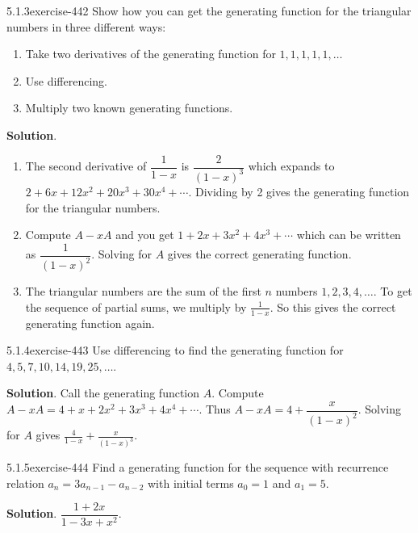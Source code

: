 \documentclass[twoside,11pt,]{book}
\numberwithin{equation}{chapter}
\renewcommand{\d}{\displaystyle}
\begin{document}
\begin{divisionsolution}{5.1.3}{}{exercise-442}%
\hypertarget{p-5092}{}%
Show how you can get the generating function for the triangular numbers in three different ways:\leavevmode%
\begin{enumerate}[label=(\alph*)]
\item\hypertarget{li-2454}{}\hypertarget{p-5093}{}%
Take two derivatives of the generating function for \(1,1,1,1,1, \ldots\)%
\item\hypertarget{li-2455}{}\hypertarget{p-5094}{}%
Use differencing.%
\item\hypertarget{li-2456}{}\hypertarget{p-5095}{}%
Multiply two known generating functions.%
\end{enumerate}
%
\par\smallskip%
\noindent\textbf{Solution}.\quad%
\hypertarget{p-5096}{}%
\leavevmode%
\begin{enumerate}[label=(\alph*)]
\item\hypertarget{li-2457}{}\hypertarget{p-5097}{}%
The second derivative of \(\dfrac{1}{1-x}\) is \(\dfrac{2}{(1-x)^3}\) which expands to \(2 + 6x + 12x^2 + 20x^3 + 30x^4 + \cdots\). Dividing by 2 gives the generating function for the triangular numbers.%
\item\hypertarget{li-2458}{}\hypertarget{p-5098}{}%
Compute \(A - xA\) and you get \(1 + 2x + 3x^2 + 4x^3 + \cdots\) which can be written as \(\dfrac{1}{(1-x)^2}\). Solving for \(A\) gives the correct generating function.%
\item\hypertarget{li-2459}{}\hypertarget{p-5099}{}%
The triangular numbers are the sum of the first \(n\) numbers \(1,2,3,4, \ldots\). To get the sequence of partial sums, we multiply by \(\frac{1}{1-x}\). So this gives the correct generating function again.%
\end{enumerate}
%
\end{divisionsolution}%
\begin{divisionsolution}{5.1.4}{}{exercise-443}%
\hypertarget{p-5100}{}%
Use differencing to find the generating function for \(4, 5, 7, 10, 14, 19, 25, \ldots\).%
\par\smallskip%
\noindent\textbf{Solution}.\quad%
\hypertarget{p-5101}{}%
Call the generating function \(A\). Compute \(A - xA = 4 + x + 2x^2 + 3x^3 + 4x^4 + \cdots\). Thus \(A - xA = 4 + \dfrac{x}{(1-x)^2}\). Solving for \(A\) gives \(\d\frac{4}{1-x} + \frac{x}{(1-x)^3}\).%
\end{divisionsolution}%
\begin{divisionsolution}{5.1.5}{}{exercise-444}%
\hypertarget{p-5102}{}%
Find a generating function for the sequence with recurrence relation \(a_n = 3a_{n-1} - a_{n-2}\) with initial terms \(a_0 = 1\) and \(a_1 = 5\).%
\par\smallskip%
\noindent\textbf{Solution}.\quad%
\hypertarget{p-5103}{}%
\(\dfrac{1+2x}{1-3x + x^2}\).%
\end{divisionsolution}%
\end{document}
